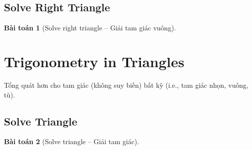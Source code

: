 \documentclass{article}
\newtheorem{baitoan}{Bài toán}
\begin{document}
\subsection{Solve Right Triangle}

\begin{baitoan}[Solve right triangle -- Giải tam giác vuông]
	
\end{baitoan}


\section{Trigonometry in Triangles}
Tổng quát hơn cho tam giác (không suy biến) bất kỳ (i.e., tam giác nhọn, vuông, tù).

\subsection{Solve Triangle}

\begin{baitoan}[Solve triangle -- Giải tam giác]
	
\end{baitoan}


\printbibliography[heading=bibintoc]
\end{document}
